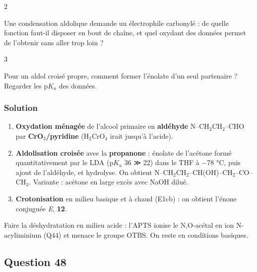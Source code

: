 \documentclass[11pt,a4paper]{article}
\providecommand{\tightlist}{\setlength{\itemsep}{0pt}\setlength{\parskip}{0pt}}
\begin{document}
\begin{indication}{2}

Une condensation aldolique demande un électrophile carbonylé : de quelle fonction faut-il disposer en bout de chaîne, et quel oxydant des données permet de l'obtenir sans aller trop loin ?

\end{indication}

\begin{indication}{3}

Pour un aldol croisé propre, comment former l'énolate d'un seul partenaire ? Regarder les p\(K_a\) des données.

\end{indication}

\hypertarget{solution-46}{%
\subsubsection{Solution}\label{solution-46}}

\begin{enumerate}
\def\labelenumi{\arabic{enumi}.}
\tightlist
\item
  \textbf{Oxydation ménagée} de l'alcool primaire en \textbf{aldéhyde} N--CH\(_2\)CH\(_2\)--CHO par \textbf{CrO\(_3\)/pyridine} (H\(_2\)CrO\(_4\) irait jusqu'à l'acide).
\item
  \textbf{Aldolisation croisée} avec la \textbf{propanone} : énolate de l'acétone formé quantitativement par le LDA (p\(K_a\) 36 ≫ 22) dans le THF à −78 °C, puis ajout de l'aldéhyde, et hydrolyse. On obtient N--CH\(_2\)CH\(_2\)--CH(OH)--CH\(_2\)--CO--CH\(_3\). Variante : acétone en large excès avec NaOH dilué.
\item
  \textbf{Crotonisation} en milieu basique et à chaud (E1cb) : on obtient l'énone conjuguée \emph{E}, \textbf{12}.
\end{enumerate}

\begin{piege}

Faire la déshydratation en milieu acide : l'APTS ionise le N,O-acétal en ion N-acyliminium (Q44) et menace le groupe OTBS. On reste en conditions basiques.

\end{piege}

\hypertarget{question-48}{%
\subsection{Question 48}\label{question-48}}
\end{document}
